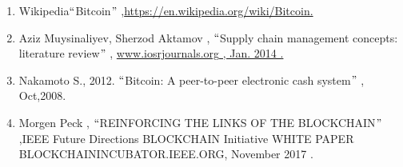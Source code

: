 \documentclass[12pt]{article}
\begin{document}
\begin{enumerate}
	\item {\fontsize{14pt}{16.8pt}\selectfont Wikipedia$``$Bitcoin$"$ ,\href{https://en.wikipedia.org/wiki/Bitcoin.}{\textcolor[HTML]{1155CC}{https://en.wikipedia.org/wiki/Bitcoin.}}\par}\par

	\item {\fontsize{14pt}{16.8pt}\selectfont Aziz Muysinaliyev, Sherzod Aktamov , $``$Supply chain management concepts: literature review$"$  , \href{http://www.iosrjournals.org/}{\textcolor[HTML]{1155CC}{www.iosrjournals.org} , Jan. 2014 .}\par}\par

	\item {\fontsize{14pt}{16.8pt}\selectfont Nakamoto S., 2012. $``$Bitcoin: A peer-to-peer electronic cash system$"$ , Oct,2008.\par}\par

	\item {\fontsize{14pt}{16.8pt}\selectfont Morgen Peck , $``$REINFORCING THE LINKS OF THE BLOCKCHAIN$"$ ,IEEE Future Directions BLOCKCHAIN Initiative WHITE PAPER BLOCKCHAININCUBATOR.IEEE.ORG, November 2017 .\par}
\end{enumerate}\par




\newpage

\vspace{\baselineskip}

\end{document}

